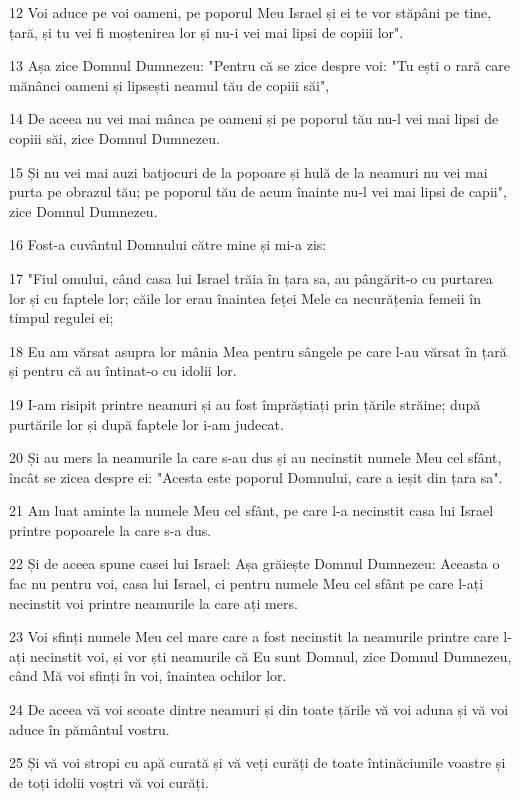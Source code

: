 \par 12 Voi aduce pe voi oameni, pe poporul Meu Israel și ei te vor stăpâni pe tine, țară, și tu vei fi moștenirea lor și nu-i vei mai lipsi de copiii lor".
\par 13 Așa zice Domnul Dumnezeu: "Pentru că se zice despre voi: "Tu ești o rară care mănânci oameni și lipsești neamul tău de copiii săi",
\par 14 De aceea nu vei mai mânca pe oameni și pe poporul tău nu-l vei mai lipsi de copiii săi, zice Domnul Dumnezeu.
\par 15 Și nu vei mai auzi batjocuri de la popoare și hulă de la neamuri nu vei mai purta pe obrazul tău; pe poporul tău de acum înainte nu-l vei mai lipsi de capii", zice Domnul Dumnezeu.
\par 16 Fost-a cuvântul Domnului către mine și mi-a zis:
\par 17 "Fiul omului, când casa lui Israel trăia în țara sa, au pângărit-o cu purtarea lor și cu faptele lor; căile lor erau înaintea feței Mele ca necurățenia femeii în timpul regulei ei;
\par 18 Eu am vărsat asupra lor mânia Mea pentru sângele pe care l-au vărsat în țară și pentru că au întinat-o cu idolii lor.
\par 19 I-am risipit printre neamuri și au fost împrăștiați prin țările străine; după purtările lor și după faptele lor i-am judecat.
\par 20 Și au mers la neamurile la care s-au dus și au necinstit numele Meu cel sfânt, încât se zicea despre ei: "Acesta este poporul Domnului, care a ieșit din țara sa".
\par 21 Am luat aminte la numele Meu cel sfânt, pe care l-a necinstit casa lui Israel printre popoarele la care s-a dus.
\par 22 Și de aceea spune casei lui Israel: Așa grăiește Domnul Dumnezeu: Aceasta o fac nu pentru voi, casa lui Israel, ci pentru numele Meu cel sfânt pe care l-ați necinstit voi printre neamurile la care ați mers.
\par 23 Voi sfinți numele Meu cel mare care a fost necinstit la neamurile printre care l-ați necinstit voi, și vor ști neamurile că Eu sunt Domnul, zice Domnul Dumnezeu, când Mă voi sfinți în voi, înaintea ochilor lor.
\par 24 De aceea vă voi scoate dintre neamuri și din toate țările vă voi aduna și vă voi aduce în pământul vostru.
\par 25 Și vă voi stropi cu apă curată și vă veți curăți de toate întinăciunile voastre și de toți idolii voștri vă voi curăți.
